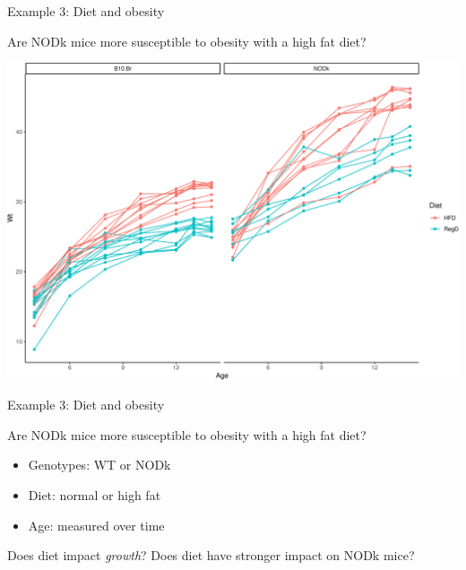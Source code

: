 \documentclass[
  12pt,
  ignorenonframetext,
  aspectratio=169,
]{beamer}
\providecommand{\tightlist}{%
  \setlength{\itemsep}{0pt}\setlength{\parskip}{0pt}}
\begin{document}
\begin{frame}{Example 3: Diet and obesity}
\protect\hypertarget{example-3-diet-and-obesity}{}

\begin{block}{Are NODk mice more susceptible to obesity with a high fat
diet?}

\includegraphics{Lecture-3_files/figure-beamer/unnamed-chunk-3-1.pdf}

\end{block}

\end{frame}

\begin{frame}{Example 3: Diet and obesity}
\protect\hypertarget{example-3-diet-and-obesity-1}{}

\begin{block}{Are NODk mice more susceptible to obesity with a high fat
diet?}

\begin{itemize}
\tightlist
\item
  Genotypes: WT or NODk
\item
  Diet: normal or high fat
\item
  Age: measured over time
\end{itemize}

\begin{block}{Does diet impact \emph{growth}? Does diet have stronger
impact on NODk mice?}

\end{block}

\end{block}

\end{frame}
\end{document}
